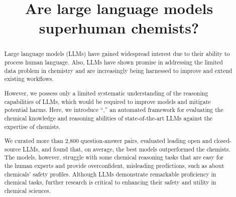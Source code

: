 \documentclass[11pt, oneside]{article}
\title{\textsf{Are large language models superhuman chemists?}}
\begin{document}
\maketitle

\clearpage
\begin{abstract}
    Large language models (LLMs) have gained widespread interest due to their ability to process human language. 
    Also, LLMs have shown promise in addressing the limited data problem in chemistry and are increasingly being harnessed to improve and extend existing workflows.

    However, we possess only a limited systematic understanding of the reasoning capabilities of LLMs, which would be required to improve models and mitigate potential harms. 
    Here, we introduce \enquote{\chembench,} an automated framework for evaluating the chemical knowledge and reasoning abilities of state-of-the-art LLMs against the expertise of chemists.

    We curated more than 2,800 question-answer pairs, evaluated leading open and closed-source LLMs, and found that, on average, the best models outperformed the chemists. 
    The models, however, struggle with some chemical reasoning tasks that are easy for the human experts and provide overconfident, misleading predictions, such as about chemicals' safety profiles. 
    Although LLMs demonstrate remarkable proficiency in chemical tasks, further research is critical to enhancing their safety and utility in chemical sciences.
\end{abstract}
\end{document}
